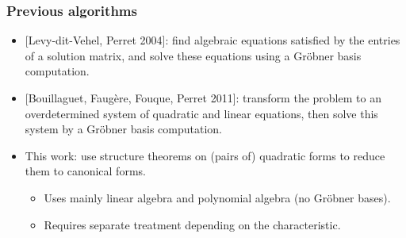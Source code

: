 \documentclass{beamer}%
\begin{document}
\begin{frame}\frametitle{Previous algorithms}%
\begin{itemize}
\item{} [Levy-dit-Vehel, Perret 2004]: find algebraic equations satisfied
by the entries of a solution matrix, and solve these equations using a
Gröbner basis computation.
\item{} [Bouillaguet, Faugère, Fouque, Perret 2011]: transform the
problem to an overdetermined system of quadratic and linear equations,
then solve this system by a Gröbner basis computation.
\bigbreak
\item This work: use structure theorems on (pairs of) quadratic forms to
reduce them to canonical forms.

\begin{itemize}
\item Uses mainly linear algebra and polynomial algebra (no Gröbner bases).
\item Requires separate treatment depending on the characteristic.
\end{itemize}
\end{itemize}
\end{frame}%
% 
\end{document}
